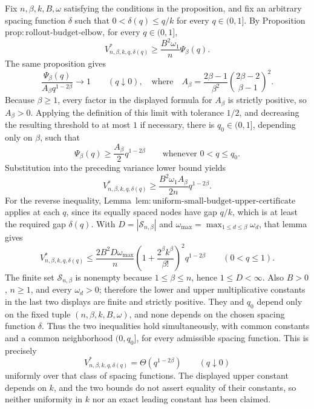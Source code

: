 Fix \(n,\beta,k,B,\omega\) satisfying the conditions in the proposition, and fix an arbitrary spacing function \(\delta\) such that \(0<\delta(q)\le q/k\) for every \(q\in(0,1]\).  By Proposition~\(\mathrm{prop{:}rollout\text{-}budget\text{-}elbow}\), for every \(q\in(0,1]\),
\[
V^*_{n,\beta,k,q,\delta(q)}\ge \frac{B^2\omega_1}{n}\Psi_\beta(q).
\]
The same proposition gives
\[
\frac{\Psi_\beta(q)}{A_\beta q^{1-2\beta}}\longrightarrow 1\qquad(q\downarrow0),
\quad\text{where}\quad
A_\beta=\frac{2\beta-1}{\beta^2}\binom{2\beta-2}{\beta-1}^{\!2}.
\]
Because \(\beta\ge1\), every factor in the displayed formula for \(A_\beta\) is strictly positive, so \(A_\beta>0\).  Applying the definition of this limit with tolerance \(1/2\), and decreasing the resulting threshold to at most \(1\) if necessary, there is \(q_0\in(0,1]\), depending only on \(\beta\), such that
\[
\Psi_\beta(q)\ge \frac{A_\beta}{2}q^{1-2\beta}
\qquad\text{whenever }0<q\le q_0.
\]
Substitution into the preceding variance lower bound yields
\[
V^*_{n,\beta,k,q,\delta(q)}\ge\frac{B^2\omega_1A_\beta}{2n}q^{1-2\beta}.
\]
For the reverse inequality, Lemma~\(\mathrm{lem{:}uniform\text{-}small\text{-}budget\text{-}upper\text{-}certificate}\) applies at each \(q\), since its equally spaced nodes have gap \(q/k\), which is at least the required gap \(\delta(q)\).  With \(D=|\mathcal S_{n,\beta}|\) and \(\omega_{\max}=\max_{1\le d\le\beta}\omega_d\), that lemma gives
\[
V^*_{n,\beta,k,q,\delta(q)}\le\frac{2B^2D\omega_{\max}}{n}\left(1+\frac{2^\beta k^\beta}{\beta!}\right)^2q^{1-2\beta}
\qquad(0<q\le1).
\]
The finite set \(\mathcal S_{n,\beta}\) is nonempty because \(1\le\beta\le n\), hence \(1\le D<\infty\).  Also \(B>0\), \(n\ge1\), and every \(\omega_d>0\); therefore the lower and upper multiplicative constants in the last two displays are finite and strictly positive.  They and \(q_0\) depend only on the fixed tuple \((n,\beta,k,B,\omega)\), and none depends on the chosen spacing function \(\delta\).  Thus the two inequalities hold simultaneously, with common constants and a common neighborhood \((0,q_0]\), for every admissible spacing function.  This is precisely
\[
V^*_{n,\beta,k,q,\delta(q)}=\Theta\!\left(q^{1-2\beta}\right)\qquad(q\downarrow0)
\]
uniformly over that class of spacing functions.  The displayed upper constant depends on \(k\), and the two bounds do not assert equality of their constants, so neither uniformity in \(k\) nor an exact leading constant has been claimed.
